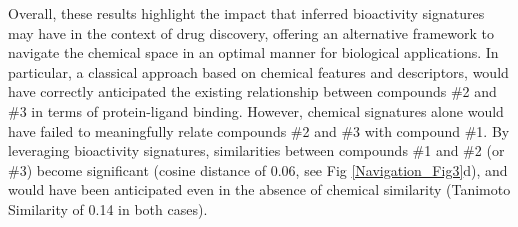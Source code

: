 Overall, these results highlight the impact that inferred bioactivity signatures may have in the context of drug discovery, offering an alternative framework to navigate the chemical space in an optimal manner for biological applications. In particular, a classical approach based on chemical features and descriptors, would have correctly anticipated the existing relationship between compounds \#2 and \#3 in terms of protein-ligand binding. However, chemical signatures alone would have failed to meaningfully relate compounds \#2 and \#3 with compound \#1. By leveraging bioactivity signatures, similarities between compounds \#1 and \#2 (or \#3) become significant (cosine distance of 0.06, see Fig \ref{Navigation_Fig3}d), and would have been anticipated even in the absence of chemical similarity (Tanimoto Similarity of 0.14 in both cases). 
